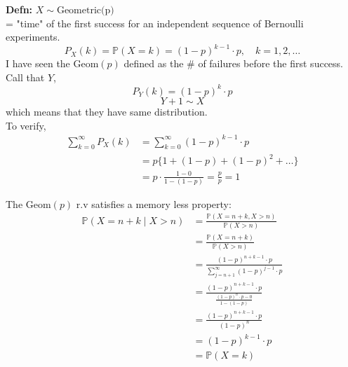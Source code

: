 \documentclass[a4paper]{article}
\newcommand{\n}{\hfill\break}
\newcommand{\defn}[1]{\par\noindent\settowidth{\hangindent}{\textbf{Defn: }}\textbf{Defn: }#1\n}
\newcommand{\Prob}{\mathbb{P}}
\renewcommand{\P}{\Prob}
\begin{document}
\defn{$X\sim\text{Geometric(p)}$ \\
= "time" of the first success for an independent sequence of Bernoulli experiments.
\[P_X(k)=\P(X=k)=(1-p)^{k-1}\cdot p,\quad k=1, 2, \dots\]
I have seen the $\text{Geom}(p)$ defined as the \# of failures before the first success. Call that $Y$,
\[P_Y(k)=(1-p)^k\cdot p\]
\[Y+1\sim X\] 
which means that they have same distribution. \\
To verify, 
\begin{align*}
    \sum^\infty_{k=0}P_X(k)&=\sum^\infty_{k=0}(1-p)^{k-1}\cdot p \\
    &=p\{1+(1-p)+(1-p)^2+\dots\} \\
    &=p\cdot\frac{1-0}{1-(1-p)}=\frac{p}{p}=1
\end{align*}

The $\text{Geom}(p)$ r.v satisfies a memory less property:
\begin{align*}
    \P(X=n+k\mid X>n)&=\frac{\P(X=n+k, X>n)}{\P(X>n)} \\
    &=\frac{\P(X=n+k)}{\P(X>n)} \\
    &=\frac{(1-p)^{n+k-1}\cdot p}{\sum^\infty_{j=n+1}(1-p)^{j-1}\cdot p} \\
    &= \frac{(1-p)^{n+k-1}\cdot p}{\frac{(1-p)^n\cdot p-0}{1-(1-p)}} \\
    &=\frac{(1-p)^{n+k-1}\cdot p}{(1-p)^n} \\
    &=(1-p)^{k-1}\cdot p \\
    &=\P(X=k)
\end{align*}
}
\end{document}
